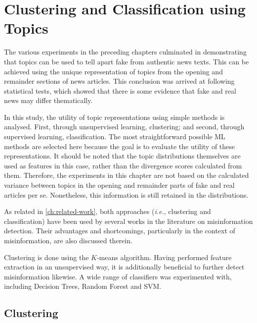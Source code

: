 \chapter{Clustering and Classification using Topics}\label{ch:clustering-and-classification}


\setcounter{con}{0}

The various experiments in the preceding chapters culminated in demonstrating that topics can be used to tell apart fake from authentic news texts. This can be achieved using the unique representation of topics from the opening and remainder sections of news articles. This conclusion was arrived at following statistical tests, which showed that there is some evidence that fake and real news may differ thematically.

In this study, the utility of topic representations using simple methods is analysed. First, through unsupervised learning, clustering; and second, through supervised learning, classification. The most straightforward possible \ac{ML} methods are selected here because the goal is to evaluate the utility of these representations. It should be noted that the topic distributions themselves are used as features in this case, rather than the divergence scores calculated from them. Therefore, the experiments in this chapter are not based on the calculated variance between topics in the opening and remainder parts of fake and real articles per se. Nonetheless, this information is still retained in the distributions.

As related in \autoref{ch:related-work}, both approaches (\emph{i.e.}, clustering and classification) have been used by several works in the literature on misinformation detection. Their advantages and shortcomings, particularly in the context of misinformation, are also discussed therein.

Clustering is done using the $K$-means algorithm. Having performed feature extraction in an unsupervised way, it is additionally beneficial to further detect misinformation likewise. A wide range of classifiers was experimented with, including Decision Trees, Random Forest and \ac{SVM}.

\section{Clustering}
\label{sec:5-clustering}


